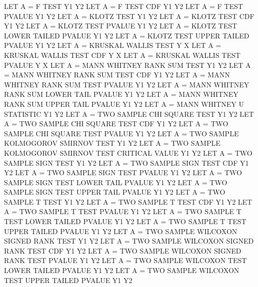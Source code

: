 {          LET A = F TEST                                             Y1 Y2
          LET A = F TEST CDF                                         Y1 Y2
          LET A = F TEST PVALUE                                      Y1 Y2
          LET A = KLOTZ TEST                                         Y1 Y2
          LET A = KLOTZ TEST CDF                                     Y1 Y2
          LET A = KLOTZ TEST PVALUE                                  Y1 Y2
          LET A = KLOTZ TEST LOWER TAILED PVALUE                     Y1 Y2
          LET A = KLOTZ TEST UPPER TAILED PVALUE                     Y1 Y2
          LET A = KRUSKAL WALLIS TEST                                Y  X
          LET A = KRUSKAL WALLIS TEST CDF                            Y  X
          LET A = KRUSKAL WALLIS TEST PVALUE                         Y  X
          LET A = MANN WHITNEY RANK SUM TEST                         Y1 Y2
          LET A = MANN WHITNEY RANK SUM TEST CDF                     Y1 Y2
          LET A = MANN WHITNEY RANK SUM TEST PVALUE                  Y1 Y2
          LET A = MANN WHITNEY RANK SUM LOWER TAIL PVALUE            Y1 Y2
          LET A = MANN WHITNEY RANK SUM UPPER TAIL PVALUE            Y1 Y2
          LET A = MANN WHITNEY U STATISTIC                           Y1 Y2
          LET A = TWO SAMPLE CHI SQUARE TEST                         Y1 Y2
          LET A = TWO SAMPLE CHI SQUARE TEST CDF                     Y1 Y2
          LET A = TWO SAMPLE CHI SQUARE TEST PVALUE                  Y1 Y2
          LET A = TWO SAMPLE KOLMOGOROV SMIRNOV TEST                 Y1 Y2
          LET A = TWO SAMPLE KOLMOGOROV SMIRNOV TEST CRITICAL VALUE  Y1 Y2
          LET A = TWO SAMPLE SIGN TEST                               Y1 Y2
          LET A = TWO SAMPLE SIGN TEST CDF                           Y1 Y2
          LET A = TWO SAMPLE SIGN TEST PVALUE                        Y1 Y2
          LET A = TWO SAMPLE SIGN TEST LOWER TAIL PVALUE             Y1 Y2
          LET A = TWO SAMPLE SIGN TEST UPPER TAIL PVALUE             Y1 Y2
          LET A = TWO SAMPLE T TEST                                  Y1 Y2
          LET A = TWO SAMPLE T TEST CDF                              Y1 Y2
          LET A = TWO SAMPLE T TEST PVALUE                           Y1 Y2
          LET A = TWO SAMPLE T TEST LOWER TAILED PVALUE              Y1 Y2
          LET A = TWO SAMPLE T TEST UPPER TAILED PVALUE              Y1 Y2
          LET A = TWO SAMPLE WILCOXON SIGNED RANK TEST               Y1 Y2
          LET A = TWO SAMPLE WILCOXON SIGNED RANK TEST CDF           Y1 Y2
          LET A = TWO SAMPLE WILCOXON SIGNED RANK TEST PVALUE        Y1 Y2
          LET A = TWO SAMPLE WILCOXON TEST LOWER TAILED PVALUE       Y1 Y2
          LET A = TWO SAMPLE WILCOXON TEST UPPER TAILED PVALUE       Y1 Y2

}
